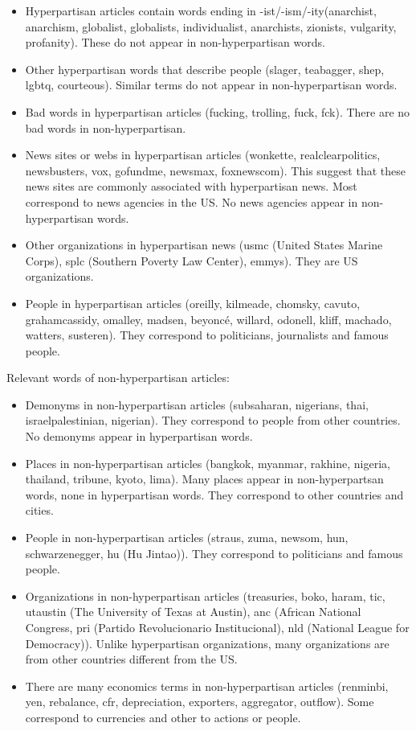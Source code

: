\documentclass[11pt,a4paper]{article}
\begin{document}
\begin{itemize}
\item
  Hyperpartisan articles contain words ending in
  -ist/-ism/-ity(anarchist, anarchism, globalist, globalists,
  individualist, anarchists, zionists, vulgarity, profanity). These do
  not appear in non-hyperpartisan words.
\item
  Other hyperpartisan words that describe people (slager, teabagger,
  shep, lgbtq, courteous). Similar terms do not appear in
  non-hyperpartisan words.
\item
  Bad words in hyperpartisan articles (fucking, trolling, fuck, fck).
  There are no bad words in non-hyperpartisan.
\item
  News sites or webs in hyperpartisan articles (wonkette,
  realclearpolitics, newsbusters, vox, gofundme, newsmax, foxnewscom).
  This suggest that these news sites are commonly associated with
  hyperpartisan news. Most correspond to news agencies in the US. No
  news agencies appear in non-hyperpartisan words.
\item
  Other organizations in hyperpartisan news (usmc (United States Marine
  Corps), splc (Southern Poverty Law Center), emmys). They are US
  organizations.
\item
  People in hyperpartisan articles (oreilly, kilmeade, chomsky, cavuto,
  grahamcassidy, omalley, madsen, beyoncé, willard, odonell, kliff,
  machado, watters, susteren). They correspond to politicians,
  journalists and famous people.
\end{itemize}

Relevant words of non-hyperpartisan articles:

\begin{itemize}
\item
  Demonyms in non-hyperpartisan articles (subsaharan, nigerians, thai,
  israelpalestinian, nigerian). They correspond to people from other
  countries. No demonyms appear in hyperpartisan words.
\item
  Places in non-hyperpartisan articles (bangkok, myanmar, rakhine,
  nigeria, thailand, tribune, kyoto, lima). Many places appear in
  non-hyperpartsan words, none in hyperpartisan words. They correspond
  to other countries and cities.
\item
  People in non-hyperpartisan articles (straus, zuma, newsom, hun,
  schwarzenegger, hu (Hu Jintao)). They correspond to politicians and
  famous people.
\item
  Organizations in non-hyperpartisan articles (treasuries, boko, haram,
  tic, utaustin (The University of Texas at Austin), anc (African
  National Congress, pri (Partido Revolucionario Institucional), nld
  (National League for Democracy)). Unlike hyperpartisan organizations,
  many organizations are from other countries different from the US.
\item
  There are many economics terms in non-hyperpartisan articles
  (renminbi, yen, rebalance, cfr, depreciation, exporters, aggregator,
  outflow). Some correspond to currencies and other to actions or
  people.
\end{itemize}
\end{document}
